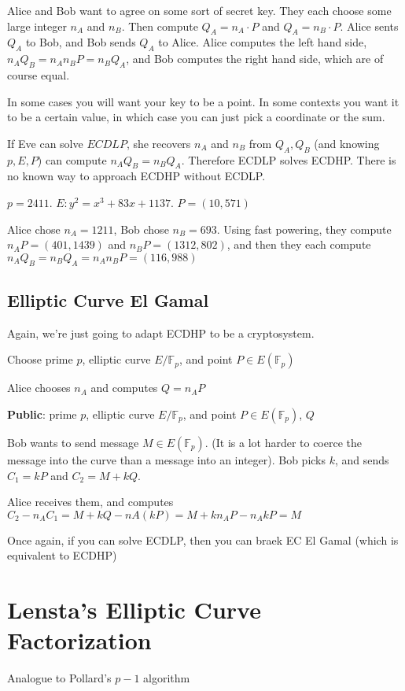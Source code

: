 \documentclass[twoside, 10pt]{article}
\newcommand{\F}{\mathbb{F}}
\begin{document}
Alice and Bob want to agree on some sort of secret key. They each choose some large integer $n_A$ and $n_B$. Then compute $Q_A = n_A \cdot P$ and $Q_A = n_B \cdot P$. Alice sents $Q_A$ to Bob, and Bob sends $Q_A$ to Alice. Alice computes the left hand side, $n_AQ_B = n_An_BP = n_BQ_A$, and Bob computes the right hand side, which are of course equal.

\begin{rmk}
    In some cases you will want your key to be a point. In some contexts you want it to be a certain value, in which case you can just pick a coordinate or the sum.
\end{rmk}

If Eve can solve $ECDLP$, she recovers $n_A$ and $n_B$ from $Q_A, Q_B$ (and knowing $p, E, P$) can compute $n_AQ_B = n_BQ_A$. Therefore ECDLP solves ECDHP. There is no known way to approach ECDHP without ECDLP.

\begin{exm*}
    $p = 2411$. $E: y^2 = x^3 + 83x + 1137$. $P = (10, 571)$
\end{exm*}

Alice chose $n_A = 1211$, Bob chose $n_B = 693$. Using fast powering, they compute $n_AP = (401, 1439)$ and $n_BP = (1312, 802)$, and then they each compute $n_AQ_B =  n_BQ_A = n_An_BP = (116, 988)$

\subsection{Elliptic Curve El Gamal} Again, we're just going to adapt ECDHP to be a cryptosystem.

Choose prime $p$, elliptic curve $E/\F_p$, and point $P \in E(\F_p)$

Alice chooses $n_A$ and computes $Q = n_A P$

\textbf{Public}: prime $p$, elliptic curve $E/\F_p$, and point $P \in E(\F_p)$, $Q$

Bob wants to send message $M \in E(\F_p)$. (It is a lot harder to coerce the message into the curve than a message into an integer). Bob picks $k$, and sends $C_1 = kP$ and $C_2 = M + kQ$.

Alice receives them, and computes $C_2 - n_AC_1 = M + kQ- nA(kP) = M + kn_AP - n_AkP = M$

Once again, if you can solve ECDLP, then you can braek EC El Gamal (which is equivalent to ECDHP)

\section{Lensta's Elliptic Curve Factorization}
Analogue to Pollard's $p-1$ algorithm
\end{document}
